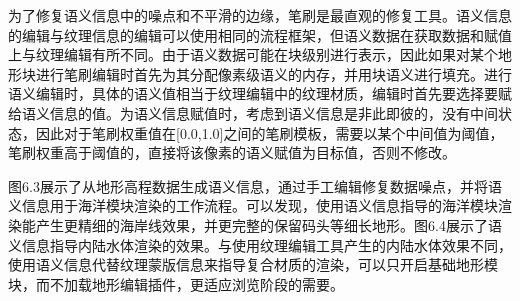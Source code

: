 为了修复语义信息中的噪点和不平滑的边缘，笔刷是最直观的修复工具。语义信息的编辑与纹理信息的编辑可以使用相同的流程框架，但语义数据在获取数据和赋值上与纹理编辑有所不同。由于语义数据可能在块级别进行表示，因此如果对某个地形块进行笔刷编辑时首先为其分配像素级语义的内存，并用块语义进行填充。进行语义编辑时，具体的语义值相当于纹理编辑中的纹理材质，编辑时首先要选择要赋给语义信息的值。为语义信息赋值时，考虑到语义信息是非此即彼的，没有中间状态，因此对于笔刷权重值在[0.0,1.0]之间的笔刷模板，需要以某个中间值为阈值，笔刷权重高于阈值的，直接将该像素的语义赋值为目标值，否则不修改。\par
图6.3展示了从地形高程数据生成语义信息，通过手工编辑修复数据噪点，并将语义信息用于海洋模块渲染的工作流程。可以发现，使用语义信息指导的海洋模块渲染能产生更精细的海岸线效果，并更完整的保留码头等细长地形。图6.4展示了语义信息指导内陆水体渲染的效果。与使用纹理编辑工具产生的内陆水体效果不同，使用语义信息代替纹理蒙版信息来指导复合材质的渲染，可以只开启基础地形模块，而不加载地形编辑插件，更适应浏览阶段的需要。\par
\newpage
